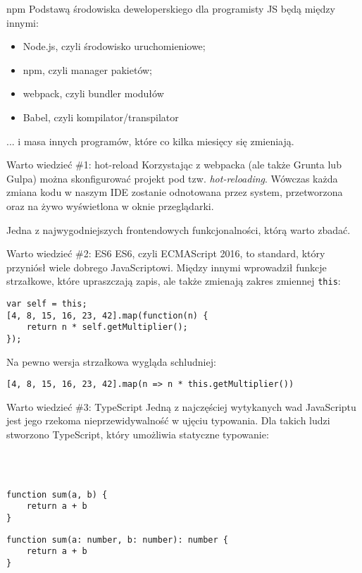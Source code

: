 \begin{frame}{npm}
	Podstawą środowiska deweloperskiego dla programisty JS będą między innymi:
	\begin{itemize}
	\item Node.js, czyli środowisko uruchomieniowe;
	\item npm, czyli manager pakietów;
	\item webpack, czyli bundler modułów
	\item Babel, czyli kompilator/transpilator
	\end{itemize}
	
	... i masa innych programów, które co kilka miesięcy się zmieniają.
\end{frame}

\begin{frame}{Warto wiedzieć \#1: hot-reload}
	Korzystając z webpacka (ale także Grunta lub Gulpa) można skonfigurować projekt pod tzw. \emph{hot-reloading}. Wówczas każda zmiana kodu w naszym IDE zostanie odnotowana przez system, przetworzona oraz na żywo wyświetlona w oknie przeglądarki.
	
	Jedna z najwygodniejszych frontendowych funkcjonalności, którą warto zbadać.
\end{frame}

\begin{frame}[fragile]{Warto wiedzieć \#2: ES6}
	ES6, czyli ECMAScript 2016, to standard, który przyniósł wiele dobrego JavaScriptowi. Między innymi wprowadził funkcje strzałkowe, które upraszczają zapis, ale także zmienają zakres zmiennej \texttt{this}:

	\begin{lstlisting}
var self = this;
[4, 8, 15, 16, 23, 42].map(function(n) {
    return n * self.getMultiplier();
});
	\end{lstlisting}
	
	Na pewno wersja strzałkowa wygląda schludniej:

	\begin{lstlisting}
[4, 8, 15, 16, 23, 42].map(n => n * this.getMultiplier())
	\end{lstlisting}
\end{frame}

\begin{frame}[fragile]{Warto wiedzieć \#3: TypeScript}
	Jedną z najczęściej wytykanych wad JavaScriptu jest jego rzekoma nieprzewidywalność w ujęciu typowania. Dla takich ludzi stworzono TypeScript, który umożliwia statyczne typowanie:
	
	\ \\ \ \\

	\begin{lstlisting}
function sum(a, b) {
    return a + b
}
	\end{lstlisting}

	\begin{lstlisting}
function sum(a: number, b: number): number {
    return a + b
}
	\end{lstlisting}
\end{frame}

